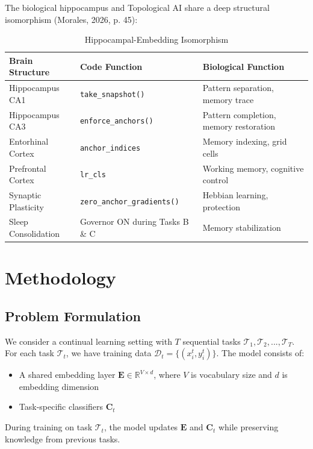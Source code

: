 \documentclass{article}
\begin{document}
The biological hippocampus and Topological AI share a deep structural isomorphism (Morales, 2026, p. 45):

\begin{table}[ht]
\centering
\caption{Hippocampal-Embedding Isomorphism}
\begin{tabular}{lll}
\toprule
Brain Structure & Code Function & Biological Function \\
\midrule
Hippocampus CA1 & \texttt{take\_snapshot()} & Pattern separation, memory trace \\
Hippocampus CA3 & \texttt{enforce\_anchors()} & Pattern completion, memory restoration \\
Entorhinal Cortex & \texttt{anchor\_indices} & Memory indexing, grid cells \\
Prefrontal Cortex & \texttt{lr\_cls} & Working memory, cognitive control \\
Synaptic Plasticity & \texttt{zero\_anchor\_gradients()} & Hebbian learning, protection \\
Sleep Consolidation & Governor ON during Tasks B \& C & Memory stabilization \\
\bottomrule
\end{tabular}
\end{table}

\section{Methodology}

\subsection{Problem Formulation}

We consider a continual learning setting with $T$ sequential tasks $\mathcal{T}_1, \mathcal{T}_2, ..., \mathcal{T}_T$. For each task $\mathcal{T}_t$, we have training data $\mathcal{D}_t = \{(x_i^t, y_i^t)\}$. The model consists of:
\begin{itemize}
\item A shared embedding layer $\mathbf{E} \in \mathbb{R}^{V \times d}$, where $V$ is vocabulary size and $d$ is embedding dimension
\item Task-specific classifiers $\mathbf{C}_t$
\end{itemize}

During training on task $\mathcal{T}_t$, the model updates $\mathbf{E}$ and $\mathbf{C}_t$ while preserving knowledge from previous tasks.
\end{document}
